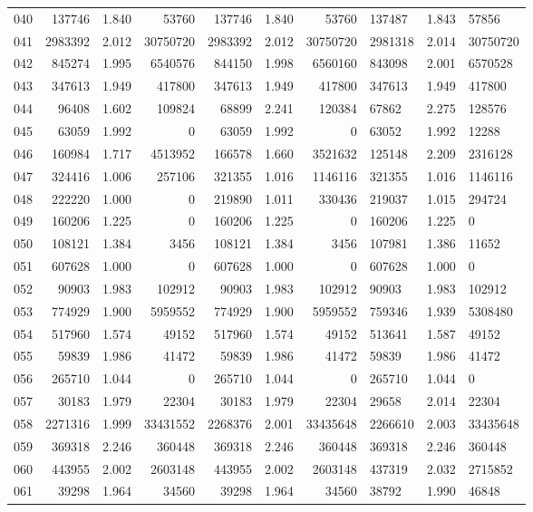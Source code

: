 \begin{longtable}{crrrrrr}
040 & 137746 & 1.840 & 53760 & 137746 & 1.840 & 53760 & 137487 & 1.843 & 57856 \\
041 & 2983392 & 2.012 & 30750720 & 2983392 & 2.012 & 30750720 & 2981318 & 2.014 & 30750720 \\
042 & 845274 & 1.995 & 6540576 & 844150 & 1.998 & 6560160 & 843098 & 2.001 & 6570528 \\
043 & 347613 & 1.949 & 417800 & 347613 & 1.949 & 417800 & 347613 & 1.949 & 417800 \\
044 & 96408 & 1.602 & 109824 & 68899 & 2.241 & 120384 & 67862 & 2.275 & 128576 \\
045 & 63059 & 1.992 & 0 & 63059 & 1.992 & 0 & 63052 & 1.992 & 12288 \\
046 & 160984 & 1.717 & 4513952 & 166578 & 1.660 & 3521632 & 125148 & 2.209 & 2316128 \\
047 & 324416 & 1.006 & 257106 & 321355 & 1.016 & 1146116 & 321355 & 1.016 & 1146116 \\
048 & 222220 & 1.000 & 0 & 219890 & 1.011 & 330436 & 219037 & 1.015 & 294724 \\
049 & 160206 & 1.225 & 0 & 160206 & 1.225 & 0 & 160206 & 1.225 & 0 \\
050 & 108121 & 1.384 & 3456 & 108121 & 1.384 & 3456 & 107981 & 1.386 & 11652 \\
051 & 607628 & 1.000 & 0 & 607628 & 1.000 & 0 & 607628 & 1.000 & 0 \\
052 & 90903 & 1.983 & 102912 & 90903 & 1.983 & 102912 & 90903 & 1.983 & 102912 \\
053 & 774929 & 1.900 & 5959552 & 774929 & 1.900 & 5959552 & 759346 & 1.939 & 5308480 \\
054 & 517960 & 1.574 & 49152 & 517960 & 1.574 & 49152 & 513641 & 1.587 & 49152 \\
055 & 59839 & 1.986 & 41472 & 59839 & 1.986 & 41472 & 59839 & 1.986 & 41472 \\
056 & 265710 & 1.044 & 0 & 265710 & 1.044 & 0 & 265710 & 1.044 & 0 \\
057 & 30183 & 1.979 & 22304 & 30183 & 1.979 & 22304 & 29658 & 2.014 & 22304 \\
058 & 2271316 & 1.999 & 33431552 & 2268376 & 2.001 & 33435648 & 2266610 & 2.003 & 33435648 \\
059 & 369318 & 2.246 & 360448 & 369318 & 2.246 & 360448 & 369318 & 2.246 & 360448 \\
060 & 443955 & 2.002 & 2603148 & 443955 & 2.002 & 2603148 & 437319 & 2.032 & 2715852 \\
061 & 39298 & 1.964 & 34560 & 39298 & 1.964 & 34560 & 38792 & 1.990 & 46848 \\

\end{longtable}
